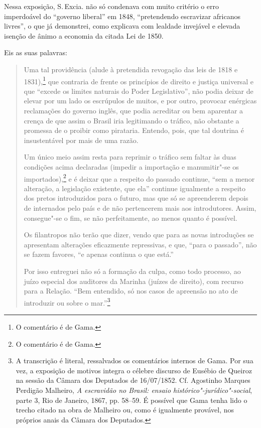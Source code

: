 Nessa exposição, S.\,Excia. não só condenava com muito critério o erro
imperdoável do ``governo liberal'' em 1848, ``pretendendo escravizar
africanos livres'', o que já demonstrei, como explicava com lealdade
invejável e elevada isenção de ânimo a economia da citada Lei de 1850.

Eis as suas palavras:

\begin{quote}
Uma tal providência (alude à pretendida revogação das leis de 1818 e
1831),\footnote{O comentário é de Gama.} que contraria de frente os
princípios de direito e justiça universal e que ``excede os limites
naturais do Poder Legislativo'', não podia deixar de elevar por um lado
os escrúpulos de muitos, e por outro, provocar enérgicas reclamações do
governo inglês, que podia acreditar ou bem aparentar a crença de que
assim o Brasil iria legitimando o tráfico, não obstante a promessa de o
proibir como pirataria. Entendo, pois, que tal doutrina é insustentável
por mais de uma razão.

Um único meio assim resta para reprimir o tráfico sem faltar às duas
condições acima declaradas (impedir a importação e manumitir"-se os
importados),\footnote{O comentário é de Gama.} e é deixar que a
respeito do passado continue, ``sem a menor alteração, a legislação
existente, que ela'' continue igualmente a respeito dos pretos
introduzidos para o futuro, mas que só se apreenderem depois de
internados pelo país e de não pertencerem mais aos introdutores. Assim,
consegue"-se o fim, se não perfeitamente, ao menos quanto é possível.

\noindent\dotfill{}

Os filantropos não terão que dizer, vendo que para as novas introduções
se apresentam alterações eficazmente repressivas, e que, ``para o
passado'', não se fazem favores, ``e apenas continua o que está.''

\noindent\dotfill{}

Por isso entreguei não só a formação da culpa, como todo processo, ao
juízo especial dos auditores da Marinha (juízes de direito), com recurso
para a Relação. ``Bem entendido, só nos casos de apreensão no ato de
introduzir ou sobre o mar.''\footnote{A transcrição é literal,
  ressalvados os comentários internos de Gama. Por sua vez, a exposição
  de motivos integra o célebre discurso de Eusébio de Queiroz na sessão
  da Câmara dos Deputados de 16/07/1852. Cf. Agostinho Marques Perdigão
Malheiro, \emph{A escravidão no Brasil: ensaio histórico"-jurídico"-social},
parte 3, Rio de Janeiro, 1867, pp. 58--59. É possível que Gama tenha lido o trecho
  citado na obra de Malheiro ou, como é igualmente provável, nos
  próprios anais da Câmara dos Deputados.}
\end{quote}  

